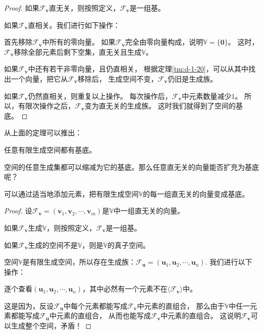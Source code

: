 \documentclass[12pt,UTF8,fontset=none]{ctexbook}
\begin{document}
\begin{appendix}
\begin{proof}
    如果$\mathcal{F}_{\mathbf{v}}$直无关，则按照定义，$\mathcal{F}_{\mathbf{v}}$是一组基。

    如果$\mathcal{F}_{\mathbf{v}}$直相关。我们进行如下操作：

    首先移除$\mathcal{F}_{\mathbf{v}}$中所有的零向量。
    如果$\mathcal{F}_{\mathbf{v}}$完全由零向量构成，说明$\mathbb{V} = \{\mathbf{0}\}$。
    这时，$\mathcal{F}_{\mathbf{v}}$移除全部元素后剩下空集，直无关且生成$\mathbb{V}$。

    如果$\mathcal{F}_{\mathbf{v}}$中还有若干非零向量，且仍直相关，
    根据定理\ref{tm:d-1-20}，可以从其中找出一个向量，把它从$\mathcal{F}_{\mathbf{v}}$移除后，
    生成空间不变，$\mathcal{F}_{\mathbf{v}}$仍旧是生成族。

    如果$\mathcal{F}_{\mathbf{v}}$仍然直相关，则重复以上操作。
    每次操作后，$\mathcal{F}_{\mathbf{v}}$中元素数量减少$1$。
    所以，有限次操作之后，$\mathcal{F}_{\mathbf{v}}$变为直无关的生成族。
    这时我们就得到了空间的基底。
\end{proof}

从上面的定理可以推出：
\begin{tm}\label{tm:d-1-50}
    任意有限生成空间都有基底。
\end{tm}

空间的任意生成集都可以缩减为它的基底。那么任意直无关的向量能否扩充为基底呢？
\begin{tm}\label{tm:d-1-60}
    可以通过适当地添加元素，把有限生成空间$\mathbb{V}$的每一组直无关的向量变成基底。
\end{tm}

\begin{proof}
    设$\mathcal{F}_{\mathbf{v}} = (\mathbf{v}_1, \mathbf{v}_2, \cdots , \mathbf{v}_m )$是$\mathbb{V}$中一组直无关的向量。

    如果$\mathcal{F}_{\mathbf{v}}$生成$\mathbb{V}$，则按照定义，$\mathcal{F}_{\mathbf{v}}$是一组基。

    如果$\mathcal{F}_{\mathbf{v}}$生成的空间不是$\mathbb{V}$，则是$\mathbb{V}$的真子空间。

    空间$\mathbb{V}$是有限生成空间，所以存在生成族：$\mathcal{F}_{\mathbf{u}} = (\mathbf{u}_1, \mathbf{u}_2, \cdots , \mathbf{u}_n )$. 我们进行以下操作：

    逐个查看$(\mathbf{u}_1, \mathbf{u}_2, \cdots , \mathbf{u}_n )$，其中必然有一个元素不在$\langle\mathcal{F}_{\mathbf{v}}\rangle$中。

    这是因为，反设$\mathcal{F}_{\mathbf{u}}$中每个元素都能写成$\mathcal{F}_{\mathbf{v}}$中元素的直组合，
    那么由于$\mathbb{V}$中任一元素都能写成$\mathcal{F}_{\mathbf{u}}$中元素的直组合，
    从而也能写成$\mathcal{F}_{\mathbf{v}}$中元素的直组合。
    这说明$\mathcal{F}_{\mathbf{v}}$可以生成整个空间，矛盾！


\end{proof}
\end{appendix}
\end{document}

